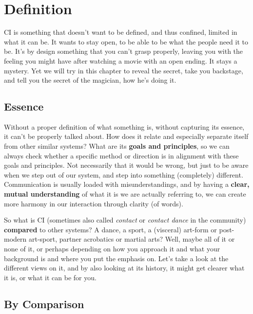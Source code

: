 \section{Definition}\label{sec:definition}


CI is something that doesn't want to be defined, and thus confined, limited in what it can be.
It wants to stay open, to be able to be what the people need it to be.
It's by design something that you can't grasp properly, leaving you with the feeling you might have after watching a movie with an open ending.
It stays a mystery.
Yet we will try in this chapter to reveal the secret, take you backstage, and tell you the secret of the magician, how he's doing it.

\subsection{Essence}\label{sec:essence}

Without a proper definition of what something is, without capturing its essence, it can't be properly talked about.
How does it relate and especially separate itself from other similar systems?
What are its \textbf{goals and principles}, so we can always check whether a specific method or direction is in alignment with these goals and principles.
Not necessarily that it would be wrong, but just to be aware when we step out of our system, and step into something (completely) different.
Communication is usually loaded with misunderstandings, and by having a \textbf{clear, mutual understanding} of what it is we are actually referring to, we can create more harmony in our interaction through clarity (of words).

So what is CI (sometimes also called \textit{contact} or \textit{contact dance} in the community) \textbf{compared} to other systems?
A dance, a sport, a (visceral) art-form or post-modern art-sport, partner acrobatics or martial arts?
Well, maybe all of it or none of it, or perhaps depending on how you approach it and what your background is and where you put the emphasis on.
Let's take a look at the different views on it, and by also looking at its history, it might get clearer what it is, or what it can be for you.

\subsection{By Comparison}\label{sec:by-comparison}

